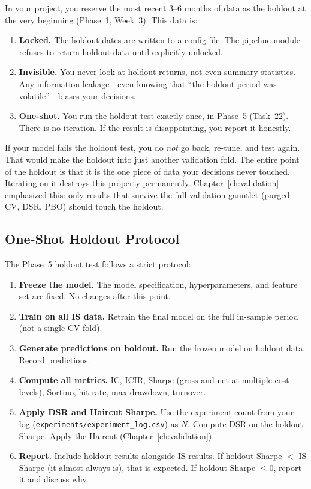 In your project, you reserve the most recent 3--6 months of data as the holdout at the very beginning (Phase~1, Week~3).  This data is:

\begin{enumerate}[nosep]
  \item \textbf{Locked.}  The holdout dates are written to a config file.  The pipeline module refuses to return holdout data until explicitly unlocked.
  \item \textbf{Invisible.}  You never look at holdout returns, not even summary statistics.  Any information leakage---even knowing that ``the holdout period was volatile''---biases your decisions.
  \item \textbf{One-shot.}  You run the holdout test exactly once, in Phase~5 (Task~22).  There is no iteration.  If the result is disappointing, you report it honestly.
\end{enumerate}

\begin{warning}
If your model fails the holdout test, you do \emph{not} go back, re-tune, and test again.  That would make the holdout into just another validation fold.  The entire point of the holdout is that it is the one piece of data your decisions never touched.  Iterating on it destroys this property permanently.  Chapter~\ref{ch:validation} emphasized this: only results that survive the full validation gauntlet (purged CV, DSR, PBO) should touch the holdout.
\end{warning}

\subsection{One-Shot Holdout Protocol}

The Phase~5 holdout test follows a strict protocol:

\begin{enumerate}[nosep]
  \item \textbf{Freeze the model.}  The model specification, hyperparameters, and feature set are fixed.  No changes after this point.
  \item \textbf{Train on all IS data.}  Retrain the final model on the full in-sample period (not a single CV fold).
  \item \textbf{Generate predictions on holdout.}  Run the frozen model on holdout data.  Record predictions.
  \item \textbf{Compute all metrics.}  IC, ICIR, Sharpe (gross and net at multiple cost levels), Sortino, hit rate, max drawdown, turnover.
  \item \textbf{Apply DSR and Haircut Sharpe.}  Use the experiment count from your log (\texttt{experiments/experiment\_log.csv}) as $N$.  Compute DSR on the holdout Sharpe.  Apply the Haircut (Chapter~\ref{ch:validation}).
  \item \textbf{Report.}  Include holdout results alongside IS results.  If holdout Sharpe $<$ IS Sharpe (it almost always is), that is expected.  If holdout Sharpe $\leq 0$, report it and discuss why.
\end{enumerate}

